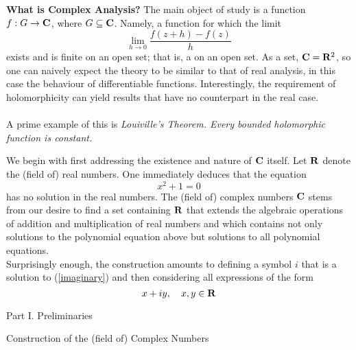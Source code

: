 \vspace*{1em}

{\bf \large What is Complex Analysis?} The main object of study is a  function $f: G \to \mathbf C$, where $G \subseteq \mathbf C$. Namely, a function for which the limit
\[\lim_{h\to 0}\frac{f(z+h) - f(z)}{h}\]
exists and is finite on an open set; that is, a  on an open set. As a set, $\mathbf C = \mathbf R^2$, so one can naively expect the theory to be similar to that of real analysis, in this case the behaviour of differentiable functions. Interestingly, the requirement of holomorphicity can yield results that have no counterpart in the real case.\\
\\
A prime example of this is \emph{Louiville's Theorem. Every bounded holomorphic function is constant.}

\vspace{1em}

\begin{discussion}
We begin with first addressing the existence and nature of $\mathbf C$ itself. Let $\mathbf R$ denote the (field of) real numbers. One immediately deduces that the equation
\begin{equation*}\label{imaginary}
x^2 + 1 = 0\tag{$*$}
\end{equation*}
has no solution in the real numbers. The (field of) complex numbers $\mathbf C$ stems from our desire to find a set containing $\mathbf R$ that extends the algebraic operations of addition and multiplication of real numbers and which contains not only solutions to the polynomial equation above but solutions to all polynomial equations.\\[0.5em]
Surprisingly enough, the construction amounts to defining a symbol $i$ that is a solution to (\ref{imaginary}) and then considering all expressions of the form
\[x + iy,\quad x,y \in \mathbf R\]
\end{discussion}

\vspace*{2em}

\begin{mdframed}[backgroundcolor=paleyellow,linewidth=1pt]
\begin{center}
{\sc\Large Part I. Preliminaries}
\end{center}
\end{mdframed}

\begin{mdframed}
\begin{center}
{\Large Construction of the (field of) Complex Numbers}
\end{center}
\end{mdframed}

